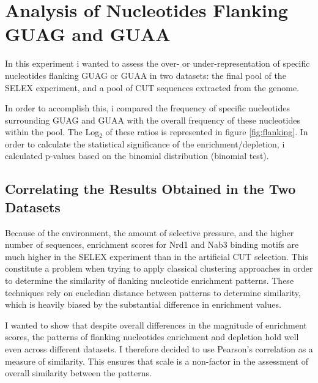\section*{Analysis of Nucleotides Flanking GUAG and GUAA}

In this experiment i wanted to assess the over- or under-representation of specific nucleotides flanking GUAG or GUAA in two datasets: the final pool of the SELEX experiment, and a pool of CUT sequences extracted from the genome. 

In order to accomplish this, i compared the frequency of specific nucleotides surrounding GUAG and GUAA with the overall frequency of these nucleotides within the pool. 
The Log$_2$ of these ratios is represented in figure \ref{fig:flanking}. 
In order to calculate the statistical significance of the enrichment/depletion, i calculated p-values based on the binomial distribution (binomial test).

\subsection*{Correlating the Results Obtained in the Two Datasets}

Because of the environment, the amount of selective pressure, and the higher number of sequences, enrichment scores for Nrd1 and Nab3 binding motifs are much higher in the SELEX experiment than in the artificial CUT selection. This constitute a problem when trying to apply classical clustering approaches in order to determine the similarity of flanking nucleotide enrichment patterns. These techniques rely on eucledian distance between patterns to determine similarity, which is heavily biased by the substantial difference in enrichment values.

I wanted to show that despite overall differences in the magnitude of enrichment scores, the patterns of flanking nucleotides enrichment and depletion hold well even across different datasets. I therefore decided to use Pearson's correlation as a measure of similarity. This ensures that scale is a non-factor in the assessment of overall similarity between the patterns.